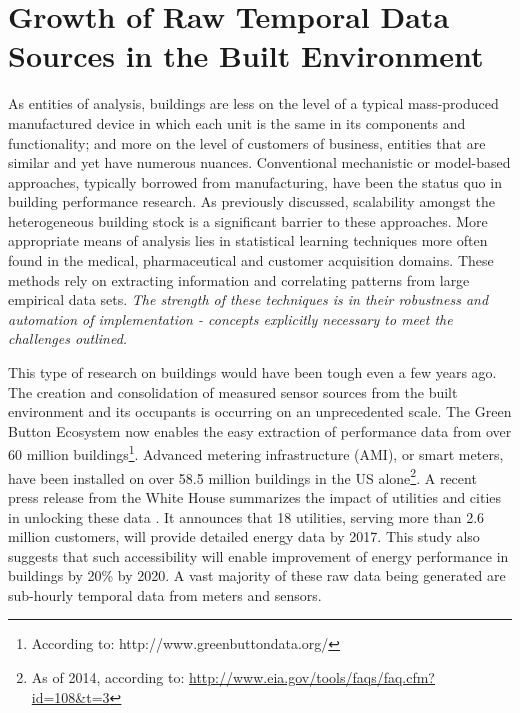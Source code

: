 \section{Growth of Raw Temporal Data Sources in the Built Environment}
\label{sec:datagrowth}

As entities of analysis, buildings are less on the level of a typical mass-produced manufactured device in which each unit is the same in its components and functionality; and more on the level of customers of business, entities that are similar and yet have numerous nuances. Conventional mechanistic or model-based approaches, typically borrowed from manufacturing, have been the status quo in building performance research. As previously discussed, scalability amongst the heterogeneous building stock is a significant barrier to these approaches. More appropriate means of analysis lies in statistical learning techniques more often found in the medical, pharmaceutical and customer acquisition domains. These methods rely on extracting information and correlating patterns from large empirical data sets. \emph{The strength of these techniques is in their robustness and automation of implementation - concepts explicitly necessary to meet the challenges outlined.}

This type of research on buildings would have been tough even a few years ago. The creation and consolidation of measured sensor sources from the built environment and its occupants is occurring on an unprecedented scale. The Green Button Ecosystem now enables the easy extraction of performance data from over 60 million buildings\footnote{According to: http://www.greenbuttondata.org/}. Advanced metering infrastructure (AMI), or smart meters, have been installed on over 58.5 million buildings in the US alone\footnote{As of 2014, according to: \url{http://www.eia.gov/tools/faqs/faq.cfm?id=108&t=3}}. A recent press release from the White House summarizes the impact of utilities and cities in unlocking these data \citep{the_white_house_fact_2016}. It announces that 18 utilities, serving more than 2.6 million customers, will provide detailed energy data by 2017. This study also suggests that such accessibility will enable improvement of energy performance in buildings by 20\% by 2020. A vast majority of these raw data being generated are sub-hourly temporal data from meters and sensors.

